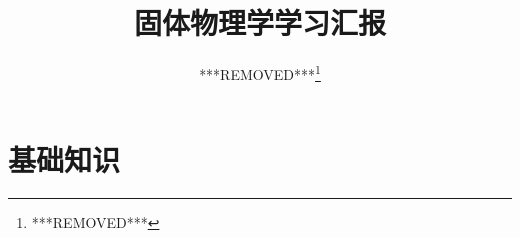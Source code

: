 \documentclass{ctexart}
\title{固体物理学学习汇报}
\author{***REMOVED***\thanks{***REMOVED***}}
\numberwithin{equation}{subsection}
\theoremstyle{definition}
\begin{document}
\maketitle
\tableofcontents
\clearpage

\section{基础知识}

\end{document}
